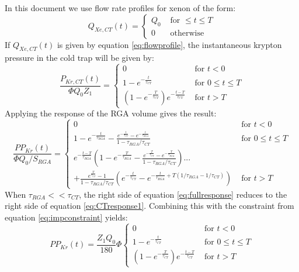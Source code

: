 \documentclass[12pt]{article}
\begin{document}
In this document we use flow rate profiles for xenon of the form:
\begin{equation}
\label{eq:flowprofile}
Q_{Xe,CT}(t) =
  \begin{cases}
    Q_0&\textrm{ for } \leq t\leq T\\
    0     &\textrm{ otherwise}
  \end{cases}
\end{equation}
If $Q_{Xe,CT}(t)$ is given by equation \ref{eq:flowprofile}, the instantaneous krypton pressure in the cold trap will be given by: 
\begin{equation}
\label{eq:CTresponse1}
\frac{P_{Kr,CT}(t)}{\Phi Q_0Z_1}=
\begin{cases}
0 & \textrm{ for } t<0\\
1-e^{-\frac{t}{\tau_{CT}}} & \textrm{ for } 0\leq t \leq T\\
(1-e^{-\frac{T}{\tau_{CT}}})e^{-\frac{t-T}{\tau_{CT}}}& \textrm{ for }  t > T
\end{cases}
\end{equation} 
Applying the response of the RGA volume gives the result:
\begin{equation}
\label{eq:fullresponse}
\frac{PP_{Kr}(t)}{\Phi Q_0 /S_{RGA}}=
\begin{cases}
0 & \textrm{ for } t<0\\
1-e^{-\frac{t}{\tau_{RGA}}}-\frac{e^{-\frac{t}{\tau_{CT}}}-e^{-\frac{t}{\tau_{RGA}}}}{1-\tau_{RGA}/\tau_{CT}} & \textrm{ for } 0\leq t \leq T\\
e^{-\frac{t-T}{\tau_{RGA}}}(1-e^{-\frac{T}{\tau_{RGA}}}-\frac{e^{-\frac{T}{\tau_{CT}}}-e^{-\frac{T}{\tau_{RGA}}}}{1-\tau_{RGA}/\tau_{CT}} ) ...\\
 +\frac{e^{\frac{T}{\tau_{CT}}}-1}{1-\tau_{RGA}/\tau_{CT}}(e^{-\frac{t}{\tau_{CT}}}-e^{-\frac{t}{\tau_{RGA}}+T(1/\tau_{RGA}-1/\tau_{CT})}) & \textrm{ for }  t > T
\end{cases}
\end{equation} 
When $\tau_{RGA}<<\tau_{CT}$, the right side of equation \ref{eq:fullresponse} reduces to the right side of equation \ref{eq:CTresponse1}. Combining this with the constraint from equation \ref{eq:impconstraint} yields:
\begin{equation}
\label{eq:CTresponse}
PP_{Kr}(t)=\frac{Z_1 Q_0}{180}\Phi
\begin{cases}
0 & \textrm{ for } t<0\\
1-e^{-\frac{t}{\tau_{CT}}} & \textrm{ for } 0\leq t \leq T\\
(1-e^{-\frac{T}{\tau_{CT}}})e^{-\frac{t-T}{\tau_{CT}}}& \textrm{ for }  t > T
\end{cases}
\end{equation} 
\end{document}
